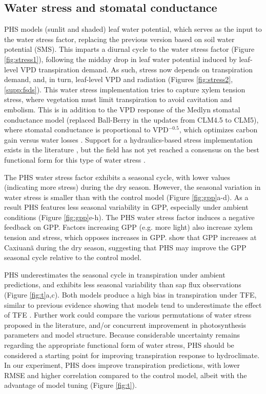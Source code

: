 \documentclass[draft,linenumbers]{agujournal}
\begin{document}
\subsection{Water stress and stomatal conductance}
    \label{sect:stress}

    PHS models (sunlit and shaded) leaf water potential, which serves as the input to the water stress factor, 
    replacing the previous version based on soil water potential (SMS).
    This imparts a diurnal cycle to the water stress factor (Figure \ref{fig:stress1}), following the midday drop in leaf water potential induced by leaf-level VPD transpiration demand.
    As such, stress now depends on transpiration demand, and, in turn, leaf-level VPD and radiation (Figures \ref{fig:stress2},\ref{supp:fsds}).
    This water stress implementation tries to capture xylem tension stress, where vegetation must limit transpiration to avoid cavitation and embolism. 
    This is in addition to the VPD response of the Medlyn stomatal conductance model (replaced Ball-Berry in the updates from CLM4.5 to CLM5),
    where stomatal conductance is proportional to VPD$^{-0.5}$, which optimizes carbon gain versus water losses \citep{medlyn2011}.
    Support for a hydraulics-based stress implementation exists in the literature \citep{novick2016a,sperry2017}, but the field has not yet reached a consensus on the best functional form for this type of water stress \citep{zhou2013}. 
    
    The PHS water stress factor exhibits a seasonal cycle, with lower values (indicating more stress) during the dry season.  
    However, the seasonal variation in water stress is smaller than with the control model (Figure \ref{fig:gpp}a-d).
    As a result PHS features less seasonal variability in GPP, especially under ambient conditions (Figure \ref{fig:gpp}e-h).
    The PHS water stress factor induces a negative feedback on GPP.
    Factors increasing GPP (e.g. more light) also increase xylem tension and stress, which opposes increases in GPP.
    \cite{restrepo2017} show that GPP increases at Caxiuan\~a during the dry season, suggesting that PHS may improve the GPP seasonal cycle relative to the control model.
    
    PHS underestimates the seasonal cycle in transpiration under ambient predictions, and exhibits less seasonal variability than sap flux observations (Figure \ref{fig:t}a,c).
    Both models produce a high bias in transpiration under TFE, similar to previous evidence showing that models tend to underestimate the effect of TFE \citep{powell2013}.
    Further work could compare the various permutations of water stress proposed in the literature, and/or concurrent improvement in photosynthesis parameters and model structure.
    Because considerable uncertainty remains regarding the appropriate functional form of water stress, PHS should be considered a starting point for improving transpiration response to hydroclimate. 
    In our experiment, PHS does improve transpiration predictions, 
    with lower RMSE and higher correlation compared to the control model, albeit with the advantage of model tuning (Figure \ref{fig:t}).
    
\end{document}
